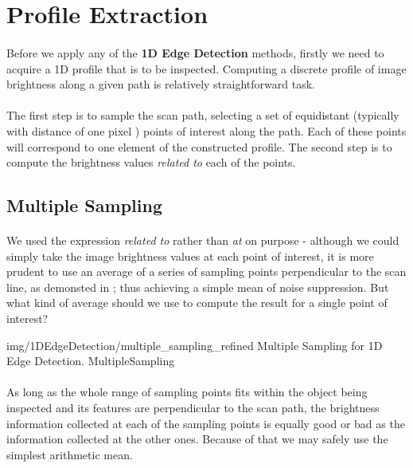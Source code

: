 \section{Profile Extraction}

\paragraph*{}
Before we apply any of the \textbf{1D Edge Detection} methods, firstly we need to acquire a 1D profile that is to be inspected. Computing a discrete profile of image brightness along a given path is relatively straightforward task.

\paragraph*{}
The first step is to sample the scan path, selecting a set of equidistant (typically with distance of one pixel \cite[p. 150]{MVTec08}) points of interest along the path. Each of these points will correspond to one element of the constructed profile. The second step is to compute the brightness values \textit{related to} each of the points.

\subsection{Multiple Sampling}
\paragraph*{}
We used the expression \textit{related to} rather than \textit{at} on purpose - although we could simply take the image brightness values at each point of interest, it is more prudent to use an average of a series of sampling points perpendicular to the scan line, as demonsted in ; thus achieving a simple mean of noise suppression. But what kind of average should we use to compute the result for a single point of interest?

\oneFigure
{img/1DEdgeDetection/multiple_sampling_refined}
{Multiple Sampling for 1D Edge Detection.}
{MultipleSampling}
{\basicWidth}

\paragraph*{}
As long as the whole range of sampling points fits within the object being inspected and its features are perpendicular to the scan path, the brightness information collected at each of the sampling points is equally good or bad as the information collected at the other ones. Because of that we may safely use the simplest arithmetic mean.

